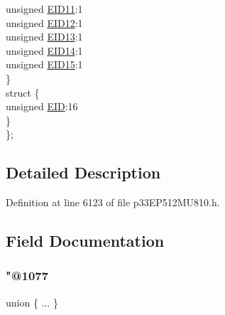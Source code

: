 \begin{DoxyCompactItemize}
\begin{tabbing}
\>\>unsigned \hyperlink{structtag_c2_r_x_m2_e_i_d_b_i_t_s_a710bdb0d602deb021b0be99066008018}{EID11}:1\\
\>\>unsigned \hyperlink{structtag_c2_r_x_m2_e_i_d_b_i_t_s_aa347bb85867bd8d4e0124f7cff8c6472}{EID12}:1\\
\>\>unsigned \hyperlink{structtag_c2_r_x_m2_e_i_d_b_i_t_s_a37d5f3edcbf6ef62f848fd4f3c584f79}{EID13}:1\\
\>\>unsigned \hyperlink{structtag_c2_r_x_m2_e_i_d_b_i_t_s_a7ffc0b0e0d99b8476b6f9a45337c17ab}{EID14}:1\\
\>\>unsigned \hyperlink{structtag_c2_r_x_m2_e_i_d_b_i_t_s_a293cd7dc1746257fa75a60cbd9383cd7}{EID15}:1\\
\>\} \\
\>struct \{\\
\>\>unsigned \hyperlink{structtag_c2_r_x_m2_e_i_d_b_i_t_s_ae80b378c9141f7c03e0b4e55b5f4b54d}{EID}:16\\
\>\} \\
\}; \\

\end{tabbing}\end{DoxyCompactItemize}


\subsection{Detailed Description}


Definition at line 6123 of file p33\+E\+P512\+M\+U810.\+h.



\subsection{Field Documentation}
\mbox{\label{structtag_c2_r_x_m2_e_i_d_b_i_t_s_a075ae874e3af19c726e1986c9d9748ff}} 
\subsubsection{\texorpdfstring{"@1077}{@1077}}
{\footnotesize\ttfamily union \{ ... \} }

\mbox{\label{structtag_c2_r_x_m2_e_i_d_b_i_t_s_ae80b378c9141f7c03e0b4e55b5f4b54d}} 
